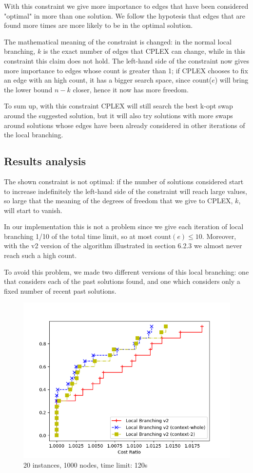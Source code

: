 With this constraint we give more importance to edges that have been considered "optimal" in more than one solution. We follow the hypotesis that edges that are found more times are more likely to be in the optimal solution.

The mathematical meaning of the constraint is changed: in the normal local branching, $k$ is the exact number of edges that CPLEX can change, while in this constraint this claim does not hold. The left-hand side of the constraint now gives more importance to edges whose count is greater than 1; if CPLEX chooses to fix an edge with an high count, it has a bigger search space, since count($e$) will bring the lower bound $n-k$ closer, hence it now has more freedom.

To sum up, with this constraint CPLEX will still search the best k-opt swap around the suggested solution, but it will also try solutions with more swaps around solutions whose edges have been already considered in other iterations of the local branching.

\subsection{Results analysis}

The shown constraint is not optimal: if the number of solutions considered start to increase indefinitely the left-hand side of the constraint will reach large values, so large that the meaning of the degrees of freedom that we give to CPLEX, $k$, will start to vanish.

In our implementation this is not a problem since we give each iteration of local branching 1/10 of the total time limit, so at most $\text{count}(e)\leq10$. Moreover, with the v2 version of the algorithm illustrated in section 6.2.3 we almost never reach such a high count.

To avoid this problem, we made two different versions of this local branching: one that considers each of the past solutions found, and one which considers only a fixed number of recent past solutions.

\begin{figure}[h]
    \centering
    \includegraphics*[width=.6\textwidth]{../plots/perfprof_lbv2_costs.png}
    \caption*{20 instances, 1000 nodes, time limit: 120s}
\end{figure}

